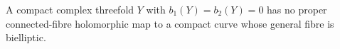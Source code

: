 
\begin{proposition}\hypertarget{tag-01FD}{}\label{cdp:st:C.3.7}



A compact complex threefold $Y$ with $b_1(Y)=b_2(Y)=0$ has no
proper connected-fibre holomorphic map to a compact curve whose
general fibre is bielliptic.
\end{proposition}

